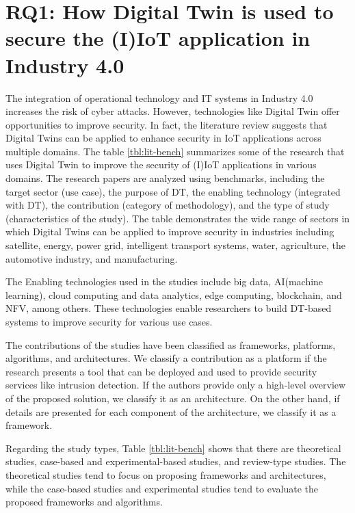 %
%
\section{RQ1: How Digital Twin is used to secure the (I)IoT application in Industry 4.0}

The integration of operational technology and IT systems in Industry 4.0 increases the risk of cyber attacks. However, technologies like Digital Twin offer opportunities to improve security\cite{dietzHarnessingDigitalTwin2022}. In fact, the literature review suggests that Digital Twins can be applied to enhance security in IoT applications across multiple domains. The table \ref{tbl:lit-bench} summarizes some of the research that uses Digital Twin to improve the security of (I)IoT applications in various domains. The research papers are analyzed using benchmarks, including the target sector (use case), the purpose of DT, the enabling technology (integrated with DT), the contribution (category of methodology), and the type of study (characteristics of the study). The table demonstrates the wide range of sectors in which Digital Twins can be applied to improve security in industries including satellite, energy, power grid, intelligent transport systems, water, agriculture, the automotive industry, and manufacturing.

The Enabling technologies used in the studies include big data,  AI(machine learning), cloud computing and data analytics, edge computing, blockchain, and NFV, among others. These technologies enable researchers to build DT-based systems to improve security for various use cases.

The contributions of the studies have been classified as frameworks, platforms, algorithms, and architectures. We classify a contribution as a platform if the research presents a tool that can be deployed and used to provide security services like intrusion detection. If the authors provide only a high-level overview of the proposed solution, we classify it as an architecture. On the other hand, if details are presented for each component of the architecture, we classify it as a framework.

Regarding the study types, Table \ref{tbl:lit-bench} shows that there are theoretical studies, case-based and experimental-based studies, and review-type studies. The theoretical studies tend to focus on proposing frameworks and architectures, while the case-based studies and experimental studies tend to evaluate the proposed frameworks and algorithms. 


